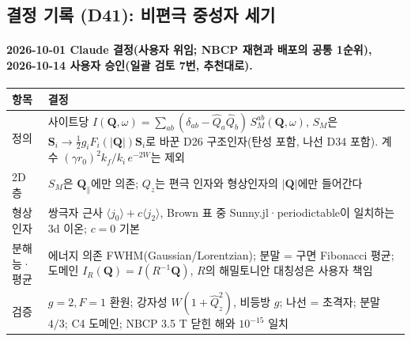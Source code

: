 \subsection{결정 기록 (D41): 비편극 중성자 세기}\label{decisions-d41-neutron}
\begingroup%
  \framesubtitle{2026-10-01 Claude 결정(사용자 위임; NBCP 재현과 배포의 공통 1순위), 2026-10-14 사용자 승인(일괄 검토 7번, 추천대로).}
  \small\renewcommand{\arraystretch}{1.12}
  \begin{tabularx}{\textwidth}{@{}P{3.0cm}Y@{}}
    \toprule
    항목 & 결정 \\
    \midrule
    정의 & 사이트당 $I(\mathbf Q,\omega)=\sum_{ab}(\delta_{ab}-\hat Q_a\hat Q_b)\,S_M^{ab}(\mathbf Q,\omega)$, $S_M$은 $\mathbf S_i\to\tfrac12 g_i F_i(|\mathbf Q|)\mathbf S_i$로 바꾼 D26 구조인자(탄성 포함, 나선 D34 포함). 계수 $(\gamma r_0)^2 k_f/k_i\,e^{-2W}$는 제외 \\
    2D 층 & $S_M$은 $\mathbf Q_\parallel$에만 의존; $Q_z$는 편극 인자와 형상인자의 $|\mathbf Q|$에만 들어간다 \\
    형상인자 & 쌍극자 근사 $\langle j_0\rangle+c\langle j_2\rangle$, Brown 표 중 Sunny.jl·periodictable이 일치하는 3d 이온; $c=0$ 기본 \\
    분해능·평균 & 에너지 의존 FWHM(Gaussian/Lorentzian); 분말 = 구면 Fibonacci 평균; 도메인 $I_R(\mathbf Q)=I(R^{-1}\mathbf Q)$, $R$의 해밀토니안 대칭성은 사용자 책임 \\
    검증 & $g=2,F=1$ 환원; 강자성 $W(1+\hat Q_z^2)$, 비등방 $g$; 나선 = 초격자; 분말 $4/3$; C4 도메인; NBCP 3.5 T 닫힌 해와 $10^{-15}$ 일치 \\
    \bottomrule
  \end{tabularx}
\endgroup


